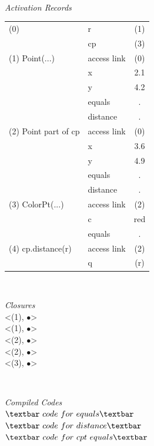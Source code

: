 \documentclass[A4paper,10pt]{paper}
\begin{document}
	\paragraph{} 
	\begin{minipage}{.45\textwidth}
		\centering
		\textit{Activation Records}	
		\begin{tabular}{l|l|c}
		\hline
		(0) 		& r			 	& (1) 	\\ 	\cline{2-3}
	     		& cp				& (3)   \\  	\cline{2-3}
		\hline
		(1)	Point(...)	& access link 	& (0) 	\\	\cline{2-3}
	   			& x				& 2.1 	\\	\cline{2-3}
	   			& y 				& 4.2 	\\	\cline{2-3}
	   			& equals			& .		\\	\cline{2-3}
	   			& distance 		& . 		\\	\cline{2-3}
		\hline
		(2) Point part of cp & access link & (0) \\ \cline{2-3}
				& x				& 3.6	\\	\cline{2-3}
				& y 				& 4.9  	\\	\cline{2-3}
				& equals 		& .		\\	\cline{2-3}
				& distance 		& .		\\	\cline{2-3}
		\hline
		(3) 	ColorPt(...) & access link 	& (2)		\\ 	\cline{2-3}
	 			& c  			& red	\\	\cline{2-3}
	 			& equals 		& .		\\
	 	\hline 
	 	(4) 	cp.distance(r) &	access link & (2)	\\	\cline{2-3}
	 			& q				& (r)	\\	\cline{2-3}
	 	\hline
	 	
		\end{tabular}
	\end{minipage}
	\makeatletter\
	\begin{minipage}{.3\textwidth}
		\centering
		\textit{Closures}\\
		<(1), $\bullet$> \\
		<(1), $\bullet$> \\
		<(2), $\bullet$> \\
		<(2), $\bullet$> \\
		<(3), $\bullet$> \\
		\end{minipage}
		\makeatletter\
		\begin{minipage}{.2\textwidth}
		\centering
		\textit{Compiled Codes}\\
		$\textbar\ code\ for\ equals \textbar $\\
		$\textbar\ code\ for\ distance \textbar$ \\
		$\textbar\ code\ for\ cpt\ equals \textbar $
	\end{minipage}
\end{document}
